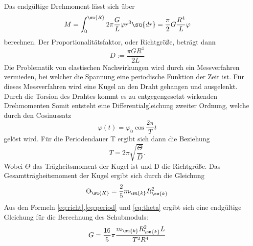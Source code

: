 Das endgültige Drehmoment lässt sich über
\begin{equation}
  M=\int_0^\su{R} 2\pi\frac{G}{L}\varphi r^3\su{dr}=\frac{\pi}{2}G\frac{R^4}
  {L}\varphi
  \label{eq:drehmoment}
\end{equation}
berechnen. Der Proportionalitätsfaktor, oder Richtgröße, beträgt dann
\begin{equation}
  D:=\frac{\pi GR^4}{2L}
  \label{eq:richt}
\end{equation}
Die Problematik von elastischen Nachwirkungen wird durch ein Messverfahren
vermieden, bei welcher die Spannung eine periodische Funktion der Zeit ist.
Für dieses Messverfahren wird eine Kugel an den Draht gehangen und ausgelenkt.
Durch die Torsion des Drahtes kommt es zu entgegengesetzt wirkenden Drehmomenten
Somit entsteht eine Differentialgleichung zweiter Ordnung, welche durch den
Cosinussatz
\begin{equation}
  \varphi(t)=\varphi_0\cos\frac{2\pi}{T}t
\end{equation}
gelöst wird. Für die Periodendauer T ergibt sich dann die Beziehung
\begin{equation}
  T=2\pi\sqrt{\frac{\Theta}{D}}.
  \label{eq:period}
\end{equation}
Wobei $\Theta$ das Trägheitsmoment der Kugel ist und D die Richtgröße.
Das Gesamtträgheitsmoment der Kugel ergibt sich durch die Gleichung
\begin{equation}
  \Theta_\su{K}=\frac{2}{5} m_\su{k}R_\su{k}^2
  \label{eq:theta}
\end{equation}
Aus den Formeln \eqref{eq:richt},\eqref{eq:period} und \eqref{eq:theta} ergibt sich
eine endgültige Gleichung für die Berechnung des Schubmoduls:
\begin{equation}
  G= \frac{16}{5}\pi\frac{m_\su{k}R_\su{k}^2L}{T^2R^4}
\end{equation}
